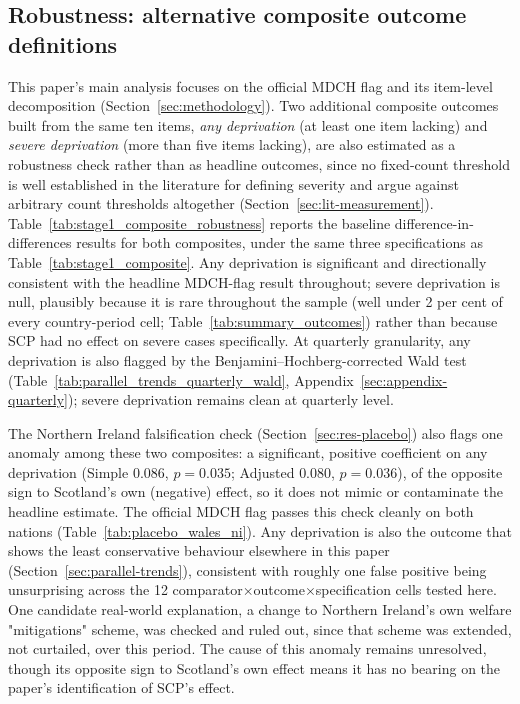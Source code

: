 

\subsection{Robustness: alternative composite outcome definitions}
\label{sec:appendix-composites}

This paper's main analysis focuses on the official MDCH flag and its item-level decomposition (Section~\ref{sec:methodology}). Two additional composite outcomes built from the same ten items, \emph{any deprivation} (at least one item lacking) and \emph{severe deprivation} (more than five items lacking), are also estimated as a robustness check rather than as headline outcomes, since no fixed-count threshold is well established in the literature for defining severity and \citet{nicoriciuelliot2025} argue against arbitrary count thresholds altogether (Section~\ref{sec:lit-measurement}). Table~\ref{tab:stage1_composite_robustness} reports the baseline difference-in-differences results for both composites, under the same three specifications as Table~\ref{tab:stage1_composite}. Any deprivation is significant and directionally consistent with the headline MDCH-flag result throughout; severe deprivation is null, plausibly because it is rare throughout the sample (well under 2 per cent of every country-period cell; Table~\ref{tab:summary_outcomes}) rather than because SCP had no effect on severe cases specifically. At quarterly granularity, any deprivation is also flagged by the Benjamini--Hochberg-corrected Wald test (Table~\ref{tab:parallel_trends_quarterly_wald}, Appendix~\ref{sec:appendix-quarterly}); severe deprivation remains clean at quarterly level.



The Northern Ireland falsification check (Section~\ref{sec:res-placebo}) also flags one anomaly among these two composites: a significant, positive coefficient on any deprivation (Simple $0.086$, $p=0.035$; Adjusted $0.080$, $p=0.036$), of the opposite sign to Scotland's own (negative) effect, so it does not mimic or contaminate the headline estimate. The official MDCH flag passes this check cleanly on both nations (Table~\ref{tab:placebo_wales_ni}). Any deprivation is also the outcome that shows the least conservative behaviour elsewhere in this paper (Section~\ref{sec:parallel-trends}), consistent with roughly one false positive being unsurprising across the 12 comparator$\times$outcome$\times$specification cells tested here. One candidate real-world explanation, a change to Northern Ireland's own welfare "mitigations" scheme, was checked and ruled out, since that scheme was extended, not curtailed, over this period. The cause of this anomaly remains unresolved, though its opposite sign to Scotland's own effect means it has no bearing on the paper's identification of SCP's effect.

